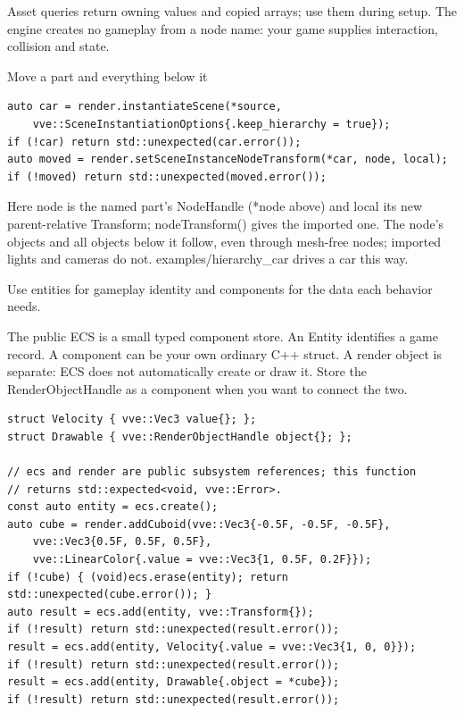 \documentclass[11pt,a4paper]{article}
\begin{document}
Asset queries return owning values and copied arrays; use them during setup. The engine creates no gameplay from a node name: your game supplies interaction, collision and state.

Move a part and everything below it

\begin{lstlisting}[language={}]
auto car = render.instantiateScene(*source,
    vve::SceneInstantiationOptions{.keep_hierarchy = true});
if (!car) return std::unexpected(car.error());
auto moved = render.setSceneInstanceNodeTransform(*car, node, local);
if (!moved) return std::unexpected(moved.error());
\end{lstlisting}

Here node is the named part's NodeHandle (*node above) and local its new parent-relative Transform; nodeTransform() gives the imported one. The node's objects and all objects below it follow, even through mesh-free nodes; imported lights and cameras do not. examples/hierarchy\_car drives a car this way.

\label{core-64}
Use entities for gameplay identity and components for the data each behavior needs.

The public ECS is a small typed component store. An Entity identifies a game record. A component can be your own ordinary C++ struct. A render object is separate: ECS does not automatically create or draw it. Store the RenderObjectHandle as a component when you want to connect the two.

\begin{lstlisting}[language={}]
struct Velocity { vve::Vec3 value{}; };
struct Drawable { vve::RenderObjectHandle object{}; };

// ecs and render are public subsystem references; this function
// returns std::expected<void, vve::Error>.
const auto entity = ecs.create();
auto cube = render.addCuboid(vve::Vec3{-0.5F, -0.5F, -0.5F},
    vve::Vec3{0.5F, 0.5F, 0.5F},
    vve::LinearColor{.value = vve::Vec3{1, 0.5F, 0.2F}});
if (!cube) { (void)ecs.erase(entity); return std::unexpected(cube.error()); }
auto result = ecs.add(entity, vve::Transform{});
if (!result) return std::unexpected(result.error());
result = ecs.add(entity, Velocity{.value = vve::Vec3{1, 0, 0}});
if (!result) return std::unexpected(result.error());
result = ecs.add(entity, Drawable{.object = *cube});
if (!result) return std::unexpected(result.error());
\end{lstlisting}
\end{document}

